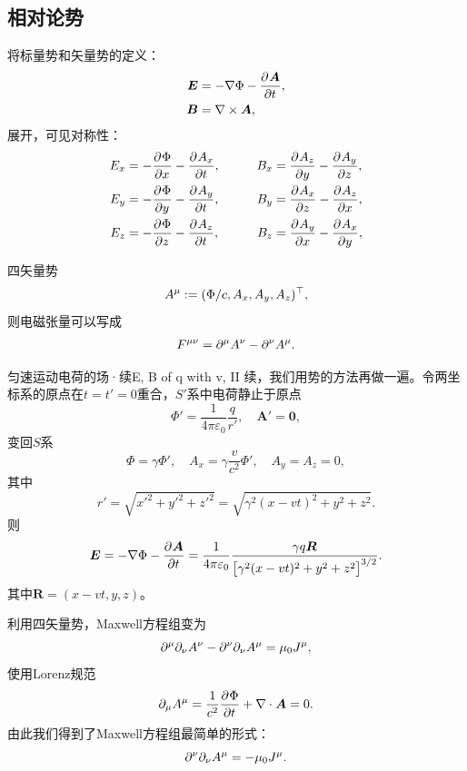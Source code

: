 \subsection{相对论势}

将标量势和矢量势的定义：
\begin{align*}
    \bm E &= -\nabla\Phi - \frac{\partial^{}\bm A}{\partial{t}^{}},\\
    \bm B &= \nabla\times\bm A,
\end{align*}
展开，可见对称性：
\begin{alignat*}{2}
    E_x &= -\frac{\partial^{}\Phi}{\partial{x}^{}} - \frac{\partial^{}A_x}{\partial{t}^{}},&\qquad B_x &= \frac{\partial^{}A_z}{\partial{y}^{}} - \frac{\partial^{}A_y}{\partial{z}^{}},\\
    E_y &= -\frac{\partial^{}\Phi}{\partial{y}^{}} - \frac{\partial^{}A_y}{\partial{t}^{}},&B_y &= \frac{\partial^{}A_x}{\partial{z}^{}} - \frac{\partial^{}A_z}{\partial{x}^{}},\\
    E_z &= -\frac{\partial^{}\Phi}{\partial{z}^{}} - \frac{\partial^{}A_z}{\partial{t}^{}},&B_z &= \frac{\partial^{}A_y}{\partial{x}^{}} - \frac{\partial^{}A_x}{\partial{y}^{}},
\end{alignat*}

四矢量势
\begin{equation}
    A^\mu := (\Phi/c,A_x,A_y,A_z)^\top,
\end{equation}
则电磁张量可以写成
\begin{equation}
    F^{\mu\nu} = \partial^\mu A^\nu - \partial^\nu A^\mu.
\end{equation}
\begin{example}{匀速运动电荷的场·续}{E, B of q with v, II}
    续，我们用势的方法再做一遍。令两坐标系的原点在$t = t' = 0$重合，$S'$系中电荷静止于原点
    \[
        \Phi' = \frac1{4\pi\varepsilon_0}\frac q{r'},\quad\bm A' = \bm 0,
    \]
    变回$S$系
    \[
        \Phi = \gamma\Phi',\quad A_x = \gamma\frac v{c^2}\Phi',\quad A_y = A_z = 0,
    \]
    其中 
    \[
        r' = \sqrt{x'^2 + y'^2 + z'^2} = \sqrt{\gamma^2(x - vt)^2 + y^2 + z^2}.
    \]
    则
    \[
        \bm E = -\nabla\Phi - \frac{\partial^{}\bm A}{\partial{t}^{}} = \frac1{4\pi\varepsilon_0}\frac{\gamma q\bm R}{\bigl[\gamma^2(x - vt)^2 + y^2 + z^2\bigr]^{3/2}}.
    \]
    其中$\bm R = (x - vt,y,z)$。
\end{example}
利用四矢量势，Maxwell方程组变为
\[
    \partial^\mu\partial_\nu A^\nu - \partial^\nu\partial_\nu A^\mu = \mu_0J^\mu,
\]
使用Lorenz规范
\begin{equation}
    \label{eq:ed-covariant-lorenz-gauge}
    \partial_\mu A^\mu = \frac1{c^2}\frac{\partial^{}\Phi}{\partial{t}^{}} + \nabla\cdot\bm A = 0.
\end{equation}
由此我们得到了Maxwell方程组最简单的形式：
\begin{equation}
    \partial^\nu\partial_\nu A^\mu = -\mu_0J^\mu.
\end{equation}

